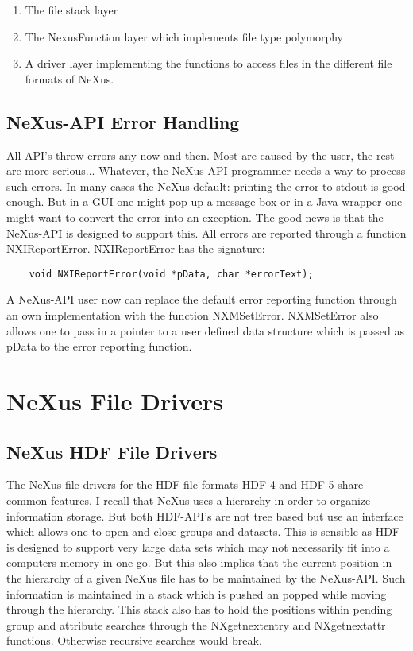 \documentclass[a4paper]{article}
\begin{document}
\begin{enumerate}\item The file stack layer
\item The NexusFunction layer which implements file type polymorphy
\item A driver layer implementing the functions to access files in the different file 
 formats of NeXus. 
\end{enumerate}\subsection{NeXus-API Error Handling }
All API's throw errors any now and then. Most are caused by the user, the rest are more serious...
Whatever, the NeXus-API programmer needs a way to process such errors. In many cases the NeXus default: 
printing the error to stdout is good enough. But in a GUI one might pop up a message box or in a Java 
wrapper one might want to convert the error into an exception. The good news is that the NeXus-API is 
designed to support this. All errors are reported through a function NXIReportError. NXIReportError has 
the signature:
\begin{verbatim}
	void NXIReportError(void *pData, char *errorText);
\end{verbatim}
A NeXus-API user now can replace the default error reporting function through an own implementation with the 
function NXMSetError. NXMSetError also allows one to pass in a pointer to a user defined data structure which is
passed as pData to the error reporting function.  


\section{NeXus File Drivers }
\subsection{NeXus HDF File Drivers }
The NeXus file drivers for the HDF file formats HDF-4 and HDF-5 share common features. I recall that 
NeXus uses a hierarchy in order to organize information storage. But both HDF-API's are not tree based 
but use an interface which allows one to open and close groups and datasets. This is sensible as HDF is designed
to support very large data sets which may not necessarily fit into a computers memory in one go. But this also 
implies that the current position in the hierarchy of a given NeXus file has to be maintained by the NeXus-API.
Such information is maintained in a stack which is pushed an popped while moving through the hierarchy. This 
stack also has to hold the positions within pending group and attribute searches through the NXgetnextentry and 
NXgetnextattr functions. Otherwise recursive searches would break.  
\end{document}
